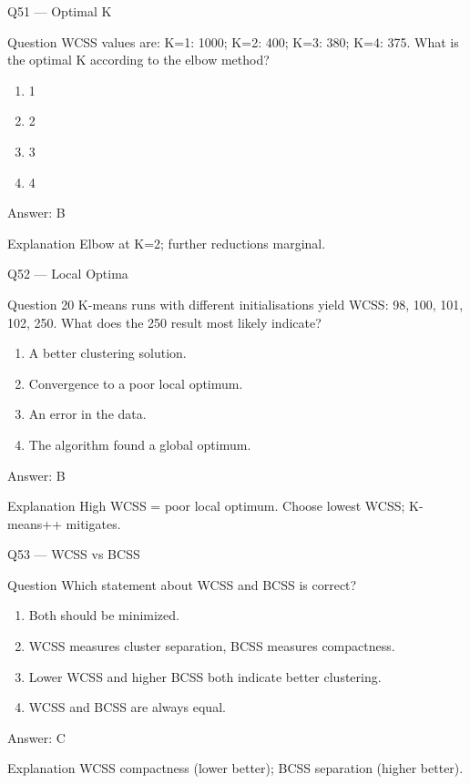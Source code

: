 \documentclass[aspectratio=169,8pt]{beamer}
\begin{document}
	\begin{frame}{Q51 --- Optimal K}
		\begin{block}{Question}
			WCSS values are: K=1: 1000; K=2: 400; K=3: 380; K=4: 375. What is the optimal K according to the elbow method?
		\end{block}
		\begin{enumerate}
			\item 1
			\item 2
			\item 3
			\item 4
		\end{enumerate}
		\begin{exampleblock}{Answer: B}\end{exampleblock}
		\begin{block}{Explanation}
			Elbow at K=2; further reductions marginal.
		\end{block}
	\end{frame}
	
	\begin{frame}{Q52 --- Local Optima}
		\begin{block}{Question}
			20 K-means runs with different initialisations yield WCSS: 98, 100, 101, 102, 250. What does the 250 result most likely indicate?
		\end{block}
		\begin{enumerate}
			\item A better clustering solution.
			\item Convergence to a poor local optimum.
			\item An error in the data.
			\item The algorithm found a global optimum.
		\end{enumerate}
		\begin{exampleblock}{Answer: B}\end{exampleblock}
		\begin{block}{Explanation}
			High WCSS = poor local optimum. Choose lowest WCSS; K-means++ mitigates.
		\end{block}
	\end{frame}
	
	\begin{frame}{Q53 --- WCSS vs BCSS}
		\begin{block}{Question}
			Which statement about WCSS and BCSS is correct?
		\end{block}
		\begin{enumerate}
			\item Both should be minimized.
			\item WCSS measures cluster separation, BCSS measures compactness.
			\item Lower WCSS and higher BCSS both indicate better clustering.
			\item WCSS and BCSS are always equal.
		\end{enumerate}
		\begin{exampleblock}{Answer: C}\end{exampleblock}
		\begin{block}{Explanation}
			WCSS compactness (lower better); BCSS separation (higher better).
		\end{block}
	\end{frame}
	
\end{document}
